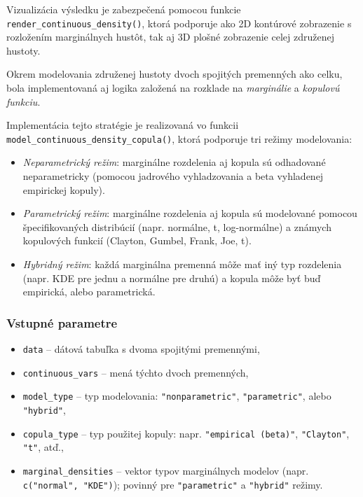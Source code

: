 Vizualizácia výsledku je zabezpečená pomocou funkcie \texttt{render\_continuous\_density()}, ktorá podporuje ako 2D kontúrové zobrazenie s rozložením marginálnych hustôt, tak aj 3D plošné zobrazenie celej združenej hustoty.

\bigskip

Okrem modelovania združenej hustoty dvoch spojitých premenných ako celku, bola implementovaná aj logika založená na rozklade na \textit{marginálie} a \textit{kopulovú funkciu}.

Implementácia tejto stratégie je realizovaná vo funkcii \texttt{model\_continuous\_density\_copula()}, ktorá podporuje tri režimy modelovania:

\begin{itemize}
  \item \textit{Neparametrický režim}: marginálne rozdelenia aj kopula sú odhadované neparametricky (pomocou jadrového vyhladzovania a beta vyhladenej empirickej kopuly).
  \item \textit{Parametrický režim}: marginálne rozdelenia aj kopula sú modelované pomocou špecifikovaných distribúcií (napr. normálne, t, log-normálne) a známych kopulových funkcií (Clayton, Gumbel, Frank, Joe, t).
  \item \textit{Hybridný režim}: každá marginálna premenná môže mať iný typ rozdelenia (napr. KDE pre jednu a normálne pre druhú) a kopula môže byť buď empirická, alebo parametrická.
\end{itemize}

\subsubsection{Vstupné parametre}

\begin{itemize}
  \item \texttt{data} – dátová tabuľka s dvoma spojitými premennými,
  \item \texttt{continuous\_vars} – mená týchto dvoch premenných,
  \item \texttt{model\_type} – typ modelovania: \texttt{"nonparametric"}, \texttt{"parametric"}, alebo \texttt{"hybrid"},
  \item \texttt{copula\_type} – typ použitej kopuly: napr. \texttt{"}\texttt{empirical (beta)"}, \texttt{"Clayton"}, \texttt{"t"}, atď.,
  \item \texttt{marginal\_densities} – vektor typov marginálnych modelov (napr. \texttt{c("normal", "KDE")}); povinný pre \texttt{"parametric"} a \texttt{"hybrid"} režimy.
\end{itemize}


